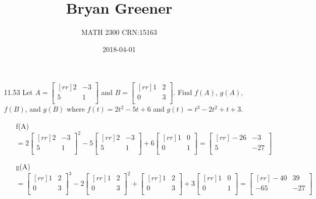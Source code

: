 \documentclass[12pt]{article}
\title{Bryan Greener}
\author{MATH 2300 CRN:15163}
\date{2018-04-01}
\theoremstyle{definition}
\theoremstyle{plain}
\begin{document}
\maketitle

\TabPositions{4cm}

\begin{enumerate}
\item[11.53]Let $A=\begin{bmatrix}[rr]2&-3\\5&1\\\end{bmatrix}$ and $B=\begin{bmatrix}[rr]1&2\\0&3\\\end{bmatrix}$. Find $f(A)$, $g(A)$, $f(B)$, and $g(B)$ where $f(t)=2t^2-5t+6$ and $g(t)=t^3-2t^2+t+3$.
	\begin{enumerate}
	\item[f(A)]$=2\begin{bmatrix}[rr]2&-3\\5&1\\\end{bmatrix}^2-5\begin{bmatrix}[rr]2&-3\\5&1\\\end{bmatrix}+6\begin{bmatrix}[rr]1&0\\0&1\\\end{bmatrix} = \begin{bmatrix}[rr]-26&-3\\5&-27\\\end{bmatrix}$
	\item[g(A)]$=\begin{bmatrix}[rr]1&2\\0&3\\\end{bmatrix}^3-2\begin{bmatrix}[rr]1&2\\0&3\\\end{bmatrix}^2+\begin{bmatrix}[rr]1&2\\0&3\\\end{bmatrix}+3\begin{bmatrix}[rr]1&0\\0&1\\\end{bmatrix} = \begin{bmatrix}[rr]-40&39\\-65&-27\\\end{bmatrix}$

\end{enumerate}
\end{enumerate}
\end{document}
